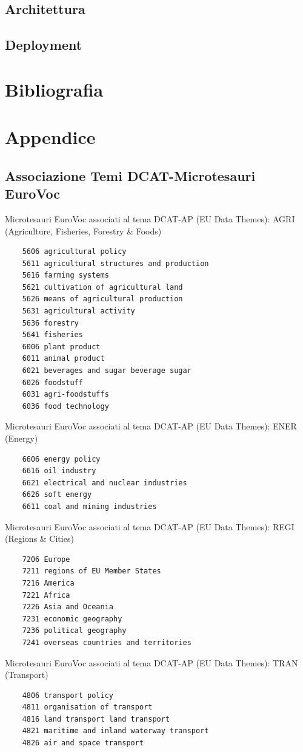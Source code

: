 \documentclass{article}
\theoremstyle{plain}
\theoremstyle{definition}
\begin{document}
\subsection{Architettura}
\subsection{Deployment}

\newpage
\section{Bibliografia}


\newpage
\section{Appendice}
\subsection{Associazione Temi DCAT-Microtesauri EuroVoc}
Microtesauri EuroVoc associati al tema DCAT-AP (EU Data Themes): AGRI (Agriculture, Fisheries, Forestry \& Foods) 
\begin{verbatim}
	5606 agricultural policy
	5611 agricultural structures and production 
	5616 farming systems 
	5621 cultivation of agricultural land 
	5626 means of agricultural production 
	5631 agricultural activity
	5636 forestry 
	5641 fisheries
	6006 plant product
	6011 animal product 
	6021 beverages and sugar beverage sugar 
	6026 foodstuff 
	6031 agri-foodstuffs
	6036 food technology
\end{verbatim}
Microtesauri EuroVoc associati al tema DCAT-AP (EU Data Themes): ENER (Energy) 
\begin{verbatim}
	6606 energy policy 
	6616 oil industry 
	6621 electrical and nuclear industries 
	6626 soft energy
	6611 coal and mining industries
\end{verbatim}
Microtesauri EuroVoc associati al tema DCAT-AP (EU Data Themes): REGI (Regions \& Cities) 
\begin{verbatim}
	7206 Europe
	7211 regions of EU Member States 
	7216 America 
	7221 Africa
	7226 Asia and Oceania
	7231 economic geography 
	7236 political geography
	7241 overseas countries and territories
\end{verbatim}
Microtesauri EuroVoc associati al tema DCAT-AP (EU Data Themes): TRAN (Transport)
\begin{verbatim}
	4806 transport policy
	4811 organisation of transport 
	4816 land transport land transport 
	4821 maritime and inland waterway transport 
	4826 air and space transport
\end{verbatim}
\end{document}
